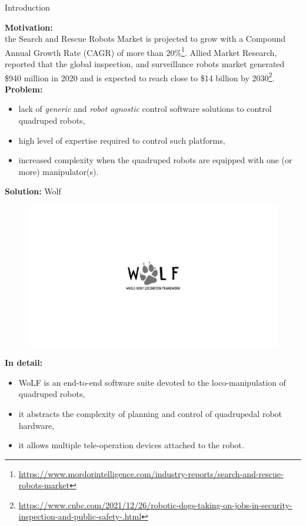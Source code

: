 \begin{myblock}{{\large Introduction}}
	
\textbf{Motivation:}\\
 the Search and Rescue Robots Market is projected to grow with a Compound Annual Growth Rate (CAGR) of more than 20\%\footnote{\url{https://www.mordorintelligence.com/industry-reports/search-and-rescue-robots-market}}.
 Allied Market Research, reported that the global inspection, and surveillance robots market generated \$940 million in 2020 and is expected to reach close to \$14 billion by 2030\footnote{\url{https://www.cnbc.com/2021/12/26/robotic-dogs-taking-on-jobs-in-security-inspection-and-public-safety-.html}}.	\\
%
\textbf{Problem:}\\
\begin{itemize}
	\setlength{\itemindent}{-10pt}
	\item lack of \textit{generic} and \textit{robot agnostic} control software solutions to control quadruped robots,
	\item high level of expertise required to control such platforms,
	\item increased complexity when the quadruped robots are equipped with one (or more) manipulator(s).
\end{itemize}
\vspace{20pt}
	
\textbf{Solution:} Wolf
\begin{figure}[thb!]
	\centering
	\includegraphics[width=0.5\columnwidth, trim={7cm 5.5cm 7cm 5.5cm}, clip=true]{images/wolf-logo.pdf}
	\label{fig:wolf_logo}
\end{figure}

\vspace{20pt}
\textbf{In detail:}\\
\begin{itemize}
	\setlength{\itemindent}{-10pt}
	\item WoLF is an end-to-end software suite devoted to the loco-manipulation of quadruped robots,
	\item it abstracts the complexity of planning and control of quadrupedal robot hardware,
	\item it allows multiple tele-operation devices attached to the robot.
	\end{itemize}
\end{myblock} 

